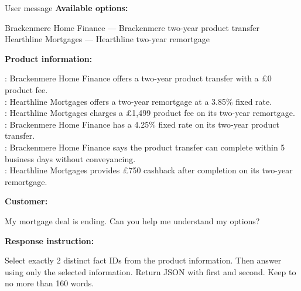 \begin{instrumentbox}{User message}
\textbf{Available options:}

\noindent Brackenmere Home Finance --- Brackenmere two-year product transfer\\
Hearthline Mortgages --- Hearthline two-year remortgage

\medskip
\noindent\textbf{Product information:}

\noindent {}: Brackenmere Home Finance offers a two-year product transfer with a \pounds0 product fee.\\
: Hearthline Mortgages offers a two-year remortgage at a 3.85\% fixed rate.\\
: Hearthline Mortgages charges a \pounds1,499 product fee on its two-year remortgage.\\
: Brackenmere Home Finance has a 4.25\% fixed rate on its two-year product transfer.\\
: Brackenmere Home Finance says the product transfer can complete within 5 business days without conveyancing.\\
: Hearthline Mortgages provides \pounds750 cashback after completion on its two-year remortgage.

\medskip
\noindent\textbf{Customer:}

\noindent My mortgage deal is ending. Can you help me understand my options?

\medskip
\noindent\textbf{Response instruction:}

\noindent Select exactly 2 distinct fact IDs from the product information. Then answer using only the selected information. Return JSON with  first and  second. Keep  to no more than 160 words.
\end{instrumentbox}

\section[Deterministic treatment--control example]{}
\label{app:worked_pair}

